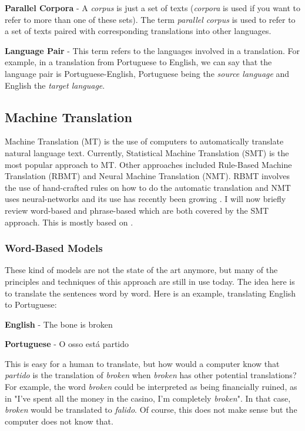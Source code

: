 \textbf{Parallel Corpora} - A \textit{corpus} is just a set of texts (\textit{corpora} is used if you want to refer to more than one of these sets). The term \textit{parallel corpus} is used to refer to a set of texts paired with corresponding translations into other languages. 

\textbf{Language Pair} - This term refers to the languages involved in a translation. For example, in a translation from Portuguese to English, we can say that the language pair is Portuguese-English, Portuguese being the \textit{source language} and English the \textit{target language}.


\subsection{Machine Translation}

Machine Translation (MT) is the use of computers to automatically translate natural language text. Currently, Statistical Machine Translation (SMT) is the most popular approach to MT. Other approaches included Rule-Based Machine Translation (RBMT) and  Neural Machine Translation (NMT). RBMT involves the use of hand-crafted rules on how to do the automatic translation and NMT uses neural-networks and its use has recently been growing \citep{Bentivogli2016}. I will now briefly review word-based and phrase-based which are both covered by the SMT approach. This is mostly based on \citep{Koehn2010}.

\subsubsection{Word-Based Models}

These kind of models are not the state of the art anymore, but many of the principles and techniques of this approach are still in use today. The idea here is to translate the sentences word by word. Here is an example, translating English to Portuguese:

\begin{center}
\textbf{English}    - The bone    is      broken

\textbf{Portuguese} -  O  osso   está     partido
\end{center}

This is easy for a human to translate, but how would a computer know that \textit{partido} is the translation of \textit{broken} when \textit{broken} has other potential translations? For example, the word \textit{broken} could be interpreted as being financially ruined, as in "I’ve spent all the money in the casino, I'm completely \textit{broken}". In that case, \textit{broken} would be translated to \textit{falido}. Of course, this does not make sense but the computer does not know that.

